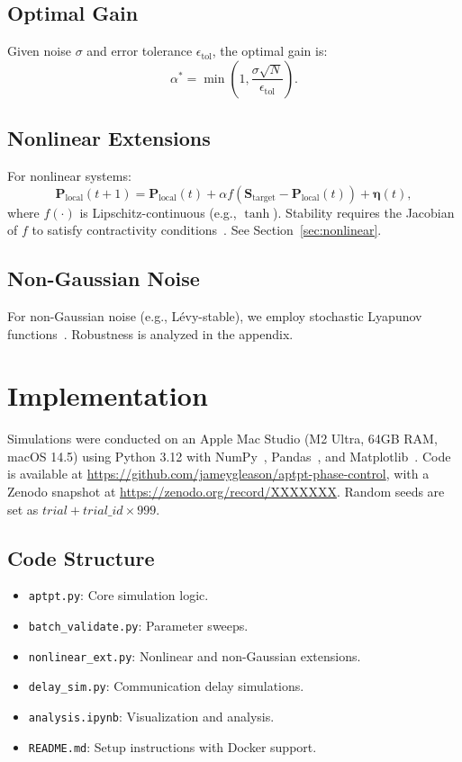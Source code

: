 \documentclass[12pt]{article}
\begin{document}
\subsection{Optimal Gain}
Given noise $\sigma$ and error tolerance $\epsilon_{\text{tol}}$, the optimal gain is:
\begin{equation}
\alpha^* = \min\left(1, \frac{\sigma \sqrt{N}}{\epsilon_{\text{tol}}}\right).
\label{eq:optimal_gain}
\end{equation}

\subsection{Nonlinear Extensions}
For nonlinear systems:
\begin{equation}
\mathbf{P}_{\text{local}}(t+1) = \mathbf{P}_{\text{local}}(t) + \alpha f(\mathbf{S}_{\text{target}} - \mathbf{P}_{\text{local}}(t)) + \mathbf{\eta}(t),
\label{eq:nonlinear}
\end{equation}
where $f(\cdot)$ is Lipschitz-continuous (e.g., $\tanh$). Stability requires the Jacobian of $f$ to satisfy contractivity conditions~\citep{Khalil2002}. See Section~\ref{sec:nonlinear}.

\subsection{Non-Gaussian Noise}
For non-Gaussian noise (e.g., L\'evy-stable), we employ stochastic Lyapunov functions~\citep{Mao2007}. Robustness is analyzed in the appendix.

\section{Implementation}
Simulations were conducted on an Apple Mac Studio (M2 Ultra, 64GB RAM, macOS 14.5) using Python 3.12 with NumPy~\citep{NumPy2020}, Pandas~\citep{Pandas2020}, and Matplotlib~\citep{Matplotlib2007}. Code is available at \url{https://github.com/jameygleason/aptpt-phase-control}, with a Zenodo snapshot at \url{https://zenodo.org/record/XXXXXXX}. Random seeds are set as $trial + trial\_id \times 999$.

\subsection{Code Structure}
\begin{itemize}
    \item \texttt{aptpt.py}: Core simulation logic.
    \item \texttt{batch\_validate.py}: Parameter sweeps.
    \item \texttt{nonlinear\_ext.py}: Nonlinear and non-Gaussian extensions.
    \item \texttt{delay\_sim.py}: Communication delay simulations.
    \item \texttt{analysis.ipynb}: Visualization and analysis.
    \item \texttt{README.md}: Setup instructions with Docker support.
\end{itemize}
\end{document}

